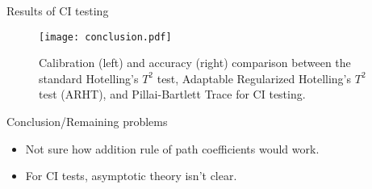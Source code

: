 \documentclass{beamer}
\begin{document}
\begin{frame}{Results of CI testing}
	\begin{figure}
		\centering
		\texttt{[image: conclusion.pdf]}
		\caption{Calibration (left) and accuracy (right) comparison between the
		standard Hotelling's $ T^2 $ test, Adaptable Regularized Hotelling's $
		T^2 $ test (ARHT), and Pillai-Bartlett Trace for CI testing.}
		\label{fig:conc_compare}
	\end{figure}

\end{frame}

\begin{frame}{Conclusion/Remaining problems}
	\begin{itemize}
		\item Not sure how addition rule of path coefficients would work.
		\item For CI tests, asymptotic theory isn't clear.
	\end{itemize}
\end{frame}
\end{document}
